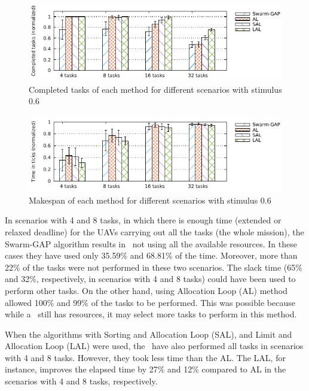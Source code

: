 %
\begin{figure}[h]
	\begin{center}
		\includegraphics[scale=1.00]{completed_tasks.pdf}
		\caption{Completed tasks of each method for different scenarios with stimulus 0.6}
		\label{grafico:tarefasconcluidas}
	\end{center}
\end{figure}


%
\begin{figure}[h]
	\begin{center}
		\includegraphics[scale=1.00]{makespan.pdf}
		\caption{Makespan of each method for different scenarios with stimulus 0.6}
		\label{grafico:ticks}
	\end{center}
\end{figure}

In scenarios with 4 and 8 tasks, in which there is enough time (extended or relaxed deadline) for the UAVs carrying out all the tasks (the whole mission), the Swarm-GAP algorithm results in \uavs\ not using all the available resources. In these cases they have used only 35.59\% and 68.81\% of the time. Moreover, more than 22\% of the tasks were not performed in these two scenarios. The slack time (65\% and 32\%, respectively, in scenarios with 4 and 8 tasks) could have been used to perform other tasks. On the other hand, using Allocation Loop (AL) method allowed 100\% and 99\% of the tasks to be performed. This was possible because while a \uav\ still has resources, it may select more tasks to perform in this method.

When the algorithms with Sorting and Allocation Loop (SAL), and Limit and Allocation Loop (LAL) were used, the \uavs\ have also performed all tasks in scenarios with 4 and 8 tasks. However, they took less time than the AL. The LAL, for instance, improves the elapsed time by 27\% and 12\% compared to AL in the scenarios with 4 and 8 tasks, respectively.

